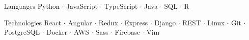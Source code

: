 


\begin{cvskills}

\cvskill
  {Languages } %
  {Python $\cdot$ JavaScript $\cdot$ TypeScript $\cdot$ Java $\cdot$ SQL $\cdot$ R } %

\cvskill
  {Technologies } %
  {React $\cdot$ Angular $\cdot$ Redux $\cdot$ Express $\cdot$ Django $\cdot$ REST $\cdot$ Linux $\cdot$ Git $\cdot$ PostgreSQL $\cdot$ Docker $\cdot$ AWS $\cdot$ Sass $\cdot$ Firebase $\cdot$ Vim } %



\end{cvskills}

